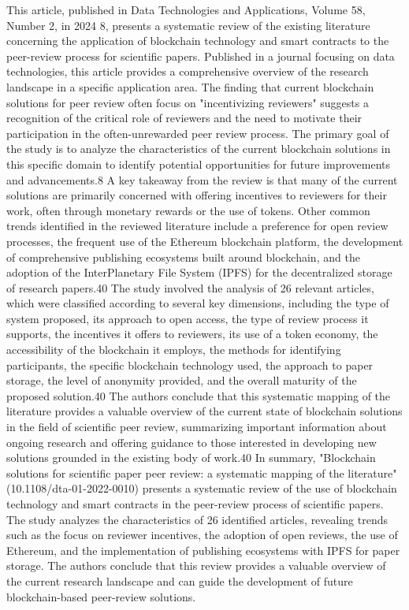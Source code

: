 \documentclass{article}
\begin{document}
This article, published in Data Technologies and Applications, Volume 58, Number 2, in 2024 8, presents a systematic review of the existing literature concerning the application of blockchain technology and smart contracts to the peer-review process for scientific papers. Published in a journal focusing on data technologies, this article provides a comprehensive overview of the research landscape in a specific application area. The finding that current blockchain solutions for peer review often focus on "incentivizing reviewers" suggests a recognition of the critical role of reviewers and the need to motivate their participation in the often-unrewarded peer review process. The primary goal of the study is to analyze the characteristics of the current blockchain solutions in this specific domain to identify potential opportunities for future improvements and advancements.8 A key takeaway from the review is that many of the current solutions are primarily concerned with offering incentives to reviewers for their work, often through monetary rewards or the use of tokens. Other common trends identified in the reviewed literature include a preference for open review processes, the frequent use of the Ethereum blockchain platform, the development of comprehensive publishing ecosystems built around blockchain, and the adoption of the InterPlanetary File System (IPFS) for the decentralized storage of research papers.40 The study involved the analysis of 26 relevant articles, which were classified according to several key dimensions, including the type of system proposed, its approach to open access, the type of review process it supports, the incentives it offers to reviewers, its use of a token economy, the accessibility of the blockchain it employs, the methods for identifying participants, the specific blockchain technology used, the approach to paper storage, the level of anonymity provided, and the overall maturity of the proposed solution.40 The authors conclude that this systematic mapping of the literature provides a valuable overview of the current state of blockchain solutions in the field of scientific peer review, summarizing important information about ongoing research and offering guidance to those interested in developing new solutions grounded in the existing body of work.40
In summary, "Blockchain solutions for scientific paper peer review: a systematic mapping of the literature" (10.1108/dta-01-2022-0010) presents a systematic review of the use of blockchain technology and smart contracts in the peer-review process of scientific papers. The study analyzes the characteristics of 26 identified articles, revealing trends such as the focus on reviewer incentives, the adoption of open reviews, the use of Ethereum, and the implementation of publishing ecosystems with IPFS for paper storage. The authors conclude that this review provides a valuable overview of the current research landscape and can guide the development of future blockchain-based peer-review solutions.
\end{document}
